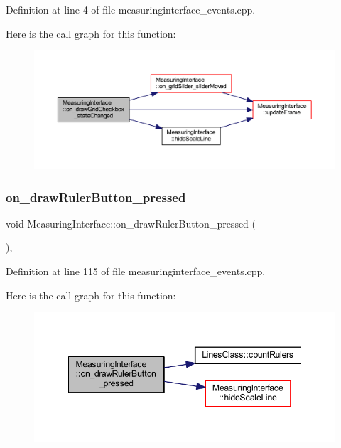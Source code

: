 Definition at line 4 of file measuringinterface\+\_\+events.\+cpp.

Here is the call graph for this function\+:
\nopagebreak
\begin{figure}[H]
\begin{center}
\leavevmode
\includegraphics[width=350pt]{classMeasuringInterface_a37da2b051cdaef7769ac1f1f8a849753_cgraph}
\end{center}
\end{figure}
\mbox{\label{classMeasuringInterface_a997fecc781bfc253f672a84a201ea846}} 
\subsubsection{\texorpdfstring{on\_drawRulerButton\_pressed}{on\_drawRulerButton\_pressed}}
{\footnotesize\ttfamily void Measuring\+Interface\+::on\+\_\+draw\+Ruler\+Button\+\_\+pressed (\begin{DoxyParamCaption}{ }\end{DoxyParamCaption})\hspace{0.3cm}{\ttfamily [private]}, {\ttfamily [slot]}}



Definition at line 115 of file measuringinterface\+\_\+events.\+cpp.

Here is the call graph for this function\+:
\nopagebreak
\begin{figure}[H]
\begin{center}
\leavevmode
\includegraphics[width=348pt]{classMeasuringInterface_a997fecc781bfc253f672a84a201ea846_cgraph}
\end{center}
\end{figure}
\mbox{\label{classMeasuringInterface_a310c3915895175fe1dc14d9234095de0}} 
